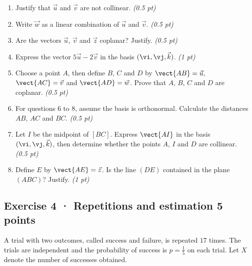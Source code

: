 \begin{enumerate}

\item Justify that $\vec u$ and $\vec v$ are not collinear. \hfill\textit{(0.5 pt)}

\item Write $\vec w$ as a linear combination of $\vec u$ and $\vec v$. \hfill\textit{(0.5 pt)}

\item Are the vectors $\vec u$, $\vec v$ and $\vec z$ coplanar? Justify. \hfill\textit{(0.5 pt)}

\item Express the vector $5\vec u-2\vec v$ in the basis $(\vi,\vj,\vec k)$. \hfill\textit{(1 pt)}

\item Choose a point $A$, then define $B$, $C$ and $D$ by $\vect{AB}=\vec u$, $\vect{AC}=\vec v$ and $\vect{AD}=\vec w$. Prove that $A$, $B$, $C$ and $D$ are coplanar. \hfill\textit{(0.5 pt)}

\item For questions 6 to 8, assume the basis is orthonormal. Calculate the distances $AB$, $AC$ and $BC$. \hfill\textit{(0.5 pt)}

\item Let $I$ be the midpoint of $[BC]$. Express $\vect{AI}$ in the basis $(\vi,\vj,\vec k)$, then determine whether the points $A$, $I$ and $D$ are collinear. \hfill\textit{(0.5 pt)}

\item Define $E$ by $\vect{AE}=\vec z$. Is the line $(DE)$ contained in the plane $(ABC)$? Justify. \hfill\textit{(1 pt)}

\end{enumerate}

\subsection*{Exercise 4 · Repetitions and estimation \hfill 5 points}A trial with two outcomes, called success and failure, is repeated $17$ times. The trials are independent and the probability of success is $p=\frac{1}{5}$ on each trial. Let $X$ denote the number of successes obtained.

